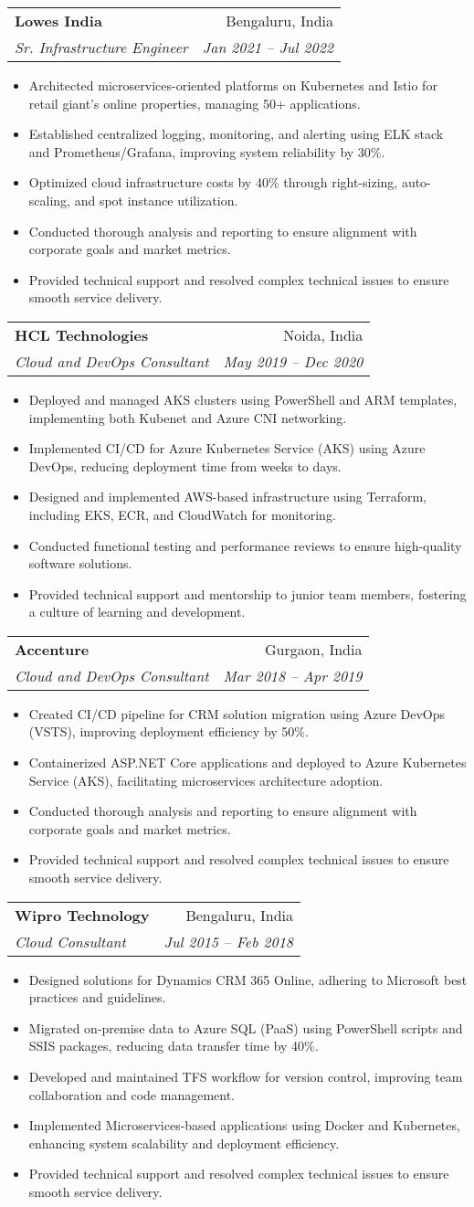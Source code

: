 \documentclass[letterpaper,11pt]{article}
\makeatletter
\newcommand{\resumeItem}[1]{\item\small{#1}}
\newcommand{\resumeSubheading}[4]{
  \vspace{2pt}\item
    \begin{tabular*}{0.97\textwidth}[t]{l@{\extracolsep{\fill}}r}
      \textbf{#1} & #2 \\
      \textit{#3} & \textit{#4} \\
    \end{tabular*}\vspace{2pt}
}
\newcommand{\resumeItemListStart}{\begin{itemize}}
\newcommand{\resumeItemListEnd}{\end{itemize}\vspace{-5pt}}
\makeatother
\begin{document}
\resumeSubheading
{Lowes India}{Bengaluru, India}
{Sr. Infrastructure Engineer}{Jan 2021 -- Jul 2022}
\resumeItemListStart
\resumeItem{Architected microservices-oriented platforms on Kubernetes and Istio for retail giant's online properties, managing 50+ applications.}
\resumeItem{Established centralized logging, monitoring, and alerting using ELK stack and Prometheus/Grafana, improving system reliability by 30\%.}
\resumeItem{Optimized cloud infrastructure costs by 40\% through right-sizing, auto-scaling, and spot instance utilization.}
\resumeItem{Conducted thorough analysis and reporting to ensure alignment with corporate goals and market metrics.}
\resumeItem{Provided technical support and resolved complex technical issues to ensure smooth service delivery.}
\resumeItemListEnd

\resumeSubheading
{HCL Technologies}{Noida, India}
{Cloud and DevOps Consultant}{May 2019 -- Dec 2020}
\resumeItemListStart
\resumeItem{Deployed and managed AKS clusters using PowerShell and ARM templates, implementing both Kubenet and Azure CNI networking.}
\resumeItem{Implemented CI/CD for Azure Kubernetes Service (AKS) using Azure DevOps, reducing deployment time from weeks to days.}
\resumeItem{Designed and implemented AWS-based infrastructure using Terraform, including EKS, ECR, and CloudWatch for monitoring.}
\resumeItem{Conducted functional testing and performance reviews to ensure high-quality software solutions.}
\resumeItem{Provided technical support and mentorship to junior team members, fostering a culture of learning and development.}
\resumeItemListEnd

\resumeSubheading
{Accenture}{Gurgaon, India}
{Cloud and DevOps Consultant}{Mar 2018 -- Apr 2019}
\resumeItemListStart
\resumeItem{Created CI/CD pipeline for CRM solution migration using Azure DevOps (VSTS), improving deployment efficiency by 50\%.}
\resumeItem{Containerized ASP.NET Core applications and deployed to Azure Kubernetes Service (AKS), facilitating microservices architecture adoption.}
\resumeItem{Conducted thorough analysis and reporting to ensure alignment with corporate goals and market metrics.}
\resumeItem{Provided technical support and resolved complex technical issues to ensure smooth service delivery.}
\resumeItemListEnd

\resumeSubheading
{Wipro Technology}{Bengaluru, India}
{Cloud Consultant}{Jul 2015 -- Feb 2018}
\resumeItemListStart
\resumeItem{Designed solutions for Dynamics CRM 365 Online, adhering to Microsoft best practices and guidelines.}
\resumeItem{Migrated on-premise data to Azure SQL (PaaS) using PowerShell scripts and SSIS packages, reducing data transfer time by 40\%.}
\resumeItem{Developed and maintained TFS workflow for version control, improving team collaboration and code management.}
\resumeItem{Implemented Microservices-based applications using Docker and Kubernetes, enhancing system scalability and deployment efficiency.}
\resumeItem{Provided technical support and resolved complex technical issues to ensure smooth service delivery.}
\resumeItemListEnd
\end{document}
